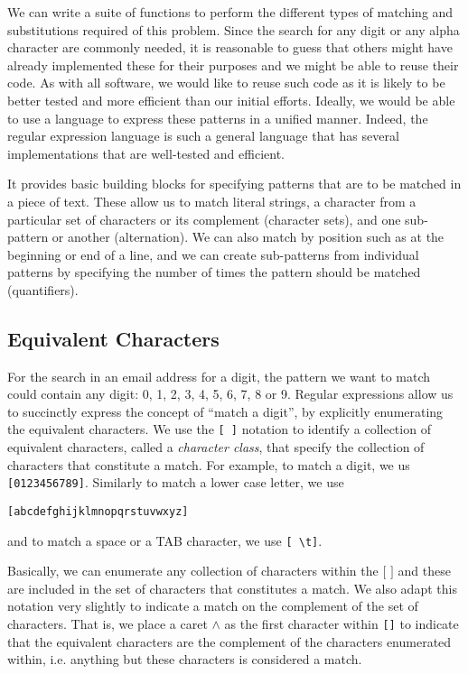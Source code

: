 We can write a suite of functions to perform the different types of
matching and substitutions required of this problem. Since the search
for any digit or any alpha character are commonly needed, it is
reasonable to guess that others might have already implemented these
for their purposes and we might be able to reuse their code.  As with
all software, we would like to reuse such code as it is likely to be
better tested and more efficient than our initial efforts.  Ideally,
we would be able to use a language to express these patterns in a
unified manner. Indeed, the regular expression language is such a
general language that has several implementations that are well-tested
and efficient.

It provides basic building blocks for specifying patterns that are to
be matched in a piece of text.  These allow us to match literal
strings, a character from a particular set of characters or its
complement (character sets), and one sub-pattern or another
(alternation).  We can also match by position such as at the beginning
or end of a line, and we can create sub-patterns from individual
patterns by specifying the number of times the pattern should be
matched (quantifiers).


\subsection{Equivalent Characters}\label{sec:charClass}
For the search in an email address for a digit, the pattern we want to
match could contain any digit: 0, 1, 2, 3, 4, 5, 6, 7, 8 or 9.
Regular expressions allow us to succinctly express the concept of
``match a digit'', by explicitly enumerating the equivalent
characters.  We use the \verb+[ ]+ notation to identify a collection of
equivalent characters, called a \textit{character class}, that specify
the collection of characters that constitute a match.  For example, to
match a digit, we us \verb+[0123456789]+.  Similarly to match a lower
case letter, we use 
{\footnotesize{
\begin{verbatim}
[abcdefghijklmnopqrstuvwxyz]
\end{verbatim}
}}
\noindent
and to match a space or a TAB character, we use
\verb+[ \t]+.

Basically, we can enumerate any collection of characters within the
$[$ $]$ and these are included in the set of characters that
constitutes a match. We also adapt this notation very slightly to
indicate a match on the complement of the set of characters.  That is,
we place a caret $\wedge$ as the first character within \verb+[]+
to indicate that the equivalent characters are the complement of the
characters enumerated within, i.e. anything but these characters is
considered a match.

